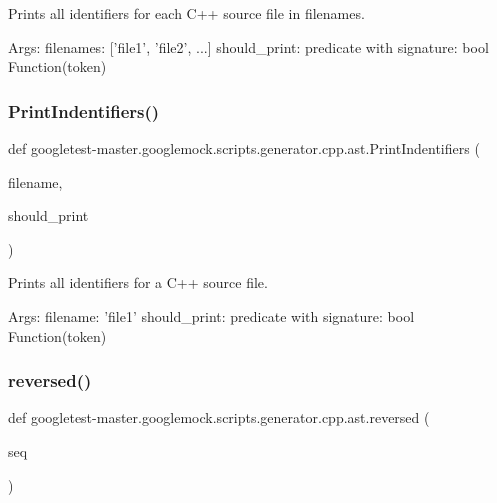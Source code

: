 \begin{DoxyVerb}Prints all identifiers for each C++ source file in filenames.

Args:
  filenames: ['file1', 'file2', ...]
  should_print: predicate with signature: bool Function(token)
\end{DoxyVerb}
 \mbox{\label{namespacegoogletest-master_1_1googlemock_1_1scripts_1_1generator_1_1cpp_1_1ast_a05c422b1ca9c409a6d70a3d92187122b}} 
\subsubsection{\texorpdfstring{PrintIndentifiers()}{PrintIndentifiers()}}
{\footnotesize\ttfamily def googletest-\/master.\+googlemock.\+scripts.\+generator.\+cpp.\+ast.\+Print\+Indentifiers (\begin{DoxyParamCaption}\item[{}]{filename,  }\item[{}]{should\+\_\+print }\end{DoxyParamCaption})}

\begin{DoxyVerb}Prints all identifiers for a C++ source file.

Args:
  filename: 'file1'
  should_print: predicate with signature: bool Function(token)
\end{DoxyVerb}
 \mbox{\label{namespacegoogletest-master_1_1googlemock_1_1scripts_1_1generator_1_1cpp_1_1ast_a5bc80d9e631b79b8f9cfb85866756a2a}} 
\subsubsection{\texorpdfstring{reversed()}{reversed()}}
{\footnotesize\ttfamily def googletest-\/master.\+googlemock.\+scripts.\+generator.\+cpp.\+ast.\+reversed (\begin{DoxyParamCaption}\item[{}]{seq }\end{DoxyParamCaption})}




